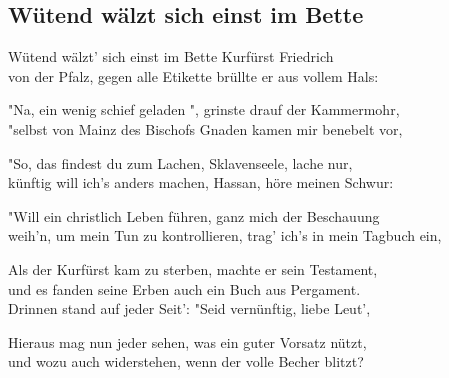 
\subsection*{Wütend wälzt sich einst im Bette}
%

\thestrophe Wütend wälzt' sich einst im Bette Kurfürst Friedrich \\
von der Pfalz, gegen alle Etikette brüllte er aus vollem Hals: \\

\thestrophe "Na, ein wenig schief geladen ", grinste drauf der Kammermohr, \\
"selbst von Mainz des Bischofs Gnaden kamen mir benebelt vor, \\

\thestrophe "So, das findest du zum Lachen, Sklavenseele, lache nur, \\
künftig will ich's anders machen, Hassan, höre meinen Schwur: \\

\thestrophe "Will ein christlich Leben führen, ganz mich der Beschauung \\
weih'n, um mein Tun zu kontrollieren, trag' ich's in mein Tagbuch ein, \\

\thestrophe Als der Kurfürst kam zu sterben, machte er sein Testament, \\
und es fanden seine Erben auch ein Buch aus Pergament. \\
Drinnen stand auf jeder Seit': "Seid vernünftig, liebe Leut', \\

\thestrophe Hieraus mag nun jeder sehen, was ein guter Vorsatz nützt, \\
und wozu auch widerstehen, wenn der volle Becher blitzt? \\
